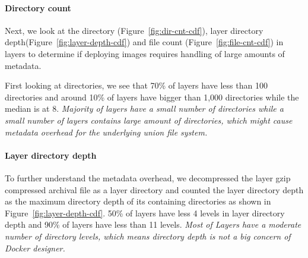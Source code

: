 

\paragraph{Directory count}



Next, we look at the directory (Figure~\ref{fig:dir-cnt-cdf}), layer directory
depth(Figure~\ref{fig:layer-depth-cdf}) and file count
(Figure~\ref{fig:file-cnt-cdf}) in layers to determine if deploying images
requires handling of large amounts of metadata.

First looking at directories, we see that
70\% of layers have less than 100 directories and around 10\% of layers have
bigger than 1,000 directories while the median is at 8.
%
\emph{Majority of layers have a small number of directories while a small
number of layers contains large amount of directories, which might cause
metadata overhead for the underlying union file system.}

\paragraph{Layer directory depth}

To further understand the metadata overhead, we decompressed the layer gzip
compressed archival file as a layer directory and counted the layer directory
depth as the maximum directory depth of its containing directories as shown in
Figure~\ref{fig:layer-depth-cdf}.
%
50\% of layers have less 4 levels in layer directory depth and 90\% of layers
have less than 11 levels.
%
\emph{Most of Layers have a moderate number of directory levels, which means
directory depth is not a big concern of Docker designer.}

